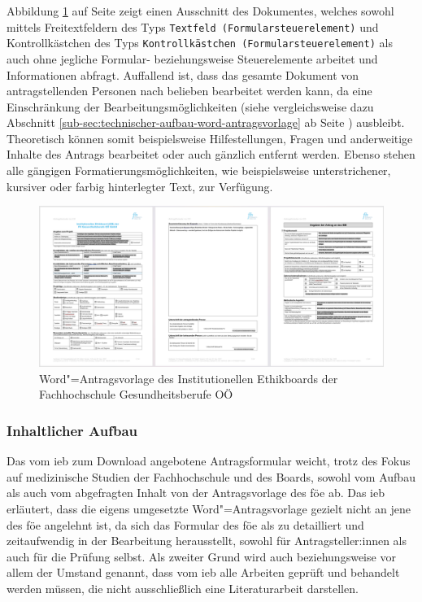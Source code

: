 \documentclass[a4paper,12pt,twoside,numbers=noendperiod]{scrreprt}
\begin{document}
\medskip

Abbildung \ref{fig:dokumentenvorlage-ieb} auf Seite \pageref{fig:dokumentenvorlage-ieb} zeigt einen Ausschnitt des Dokumentes, welches sowohl mittels Freitextfeldern des Typs \texttt{Textfeld (Formularsteuerelement)} und Kontrollkästchen des Typs \texttt{Kontrollkästchen (Formularsteuerelement)} als auch ohne jegliche Formular- beziehungsweise Steuerelemente arbeitet und Informationen abfragt. Auffallend ist, dass das gesamte Dokument von antragstellenden Personen nach belieben bearbeitet werden kann, da eine Einschränkung der Bearbeitungsmöglichkeiten (siehe vergleichsweise dazu Abschnitt \ref{sub-sec:technischer-aufbau-word-antragsvorlage} ab Seite \pageref{sub-sec:technischer-aufbau-word-antragsvorlage}) ausbleibt. Theoretisch können somit beispielsweise Hilfestellungen, Fragen und anderweitige Inhalte des Antrags bearbeitet oder auch gänzlich entfernt werden. Ebenso stehen alle gängigen Formatierungsmöglichkeiten, wie beispielsweise unterstrichener, kursiver oder farbig hinterlegter Text, zur Verfügung.

\begin{figure}[ht]
    \centering
    \includegraphics[scale=0.21]{thesis/images/Luidold_Word-Vorlage-IEB-FH-Gesundheitsberufe-OOE.png}
    \caption[Word"=Antragsvorlage des Institutionellen Ethikboards der Fachhochschule Gesundheitsberufe OÖ]{Word"=Antragsvorlage des Institutionellen Ethikboards der Fachhochschule Gesundheitsberufe OÖ \cite{fh_gesundheitsberufe_oo_gmbh_dokumente_2023}}
    \label{fig:dokumentenvorlage-ieb}
\end{figure}

\subsubsection*{Inhaltlicher Aufbau}
\label{sub-sub-sec:fh-oö-inhaltlicher-aufbau}

Das vom \ac{ieb} zum Download angebotene Antragsformular weicht, trotz des Fokus auf medizinische Studien der Fachhochschule und des Boards, sowohl vom Aufbau als auch vom abgefragten Inhalt von der Antragsvorlage des \ac{föe} ab. Das \ac{ieb} erläutert, dass die eigens umgesetzte Word"=Antragsvorlage gezielt nicht an jene des \ac{föe} angelehnt ist, da sich das Formular des \ac{föe} als zu detailliert und zeitaufwendig in der Bearbeitung herausstellt, sowohl für Antragsteller:innen als auch für die Prüfung selbst. Als zweiter Grund wird auch beziehungsweise vor allem der Umstand genannt, dass vom \ac{ieb} alle Arbeiten geprüft und behandelt werden müssen, die nicht ausschließlich eine Literaturarbeit darstellen. \cite{rosendahl-huber_extern-erfahrungen_2023}
\end{document}
